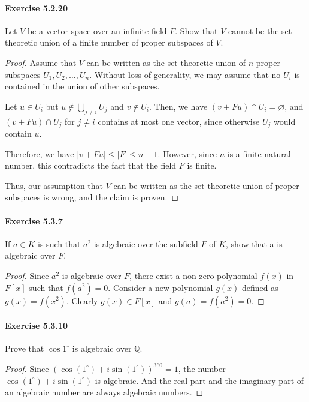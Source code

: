 \documentclass{article}
\begin{document}
\paragraph{Exercise 5.2.20} Let $V$ be a vector space over an infinite field $F$. Show that $V$ cannot be the set-theoretic union of a finite number of proper subspaces of $V$.
\begin{proof}
    Assume that $V$ can be written as the set-theoretic union of $n$ proper subspaces $U_1, U_2, \ldots, U_n$. Without loss of generality, we may assume that no $U_i$ is contained in the union of other subspaces.

Let $u \in U_i$ but $u \notin \bigcup_{j \neq i} U_j$ and $v \notin U_i$. Then, we have $(v + Fu) \cap U_i = \varnothing$, and $(v + Fu) \cap U_j$ for $j \neq i$ contains at most one vector, since otherwise $U_j$ would contain $u$.

Therefore, we have $|v + Fu| \leq |F| \leq n-1$. However, since $n$ is a finite natural number, this contradicts the fact that the field $F$ is finite.

Thus, our assumption that $V$ can be written as the set-theoretic union of proper subspaces is wrong, and the claim is proven.
\end{proof}

\paragraph{Exercise 5.3.7} If $a \in K$ is such that $a^2$ is algebraic over the subfield $F$ of $K$, show that a is algebraic over $F$.
\begin{proof}
    Since $a^2$ is algebraic over $F$, there exist a non-zero polynomial $f(x)$ in $F[x]$ such that $f\left(a^2\right)=0$. Consider a new polynomial $g(x)$ defined as $g(x)=f\left(x^2\right)$. Clearly $g(x) \in F[x]$ and $g(a)=f\left(a^2\right)= 0$.
\end{proof}



\paragraph{Exercise 5.3.10} Prove that $\cos 1^{\circ}$  is algebraic over $\mathbb{Q}$.
\begin{proof}
    Since $\left(\cos \left(1^{\circ}\right)+i \sin \left(1^{\circ}\right)\right)^{360}=1$, the number $\cos \left(1^{\circ}\right)+i \sin \left(1^{\circ}\right)$ is algebraic. And the real part and the imaginary part of an algebraic number are always algebraic numbers.
\end{proof}
\end{document}
